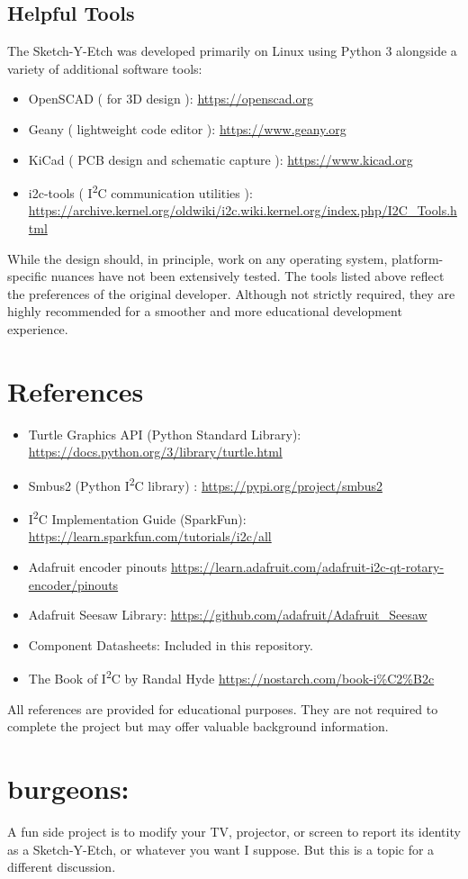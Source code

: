\documentclass[]{article}
\begin{document}
\subsection*{Helpful Tools}

The Sketch-Y-Etch was developed primarily on Linux using Python 3 alongside a variety of additional software tools:

\begin{itemize}
	\item OpenSCAD ( for 3D design ): \url{https://openscad.org}
	\item Geany ( lightweight code editor ): \url{https://www.geany.org}
	\item KiCad ( PCB design and schematic capture ): \url{https://www.kicad.org}
	\item i2c-tools ( I\textsuperscript{2}C communication utilities ): \url{https://archive.kernel.org/oldwiki/i2c.wiki.kernel.org/index.php/I2C_Tools.html}
\end{itemize}

While the design should, in principle, work on any operating system, platform-specific nuances have not been extensively tested.  
The tools listed above reflect the preferences of the original developer. Although not strictly required, they are highly recommended for a smoother and more educational development experience.

\section*{References}

\begin{itemize}
	\item Turtle Graphics API (Python Standard Library): \url{https://docs.python.org/3/library/turtle.html}
	\item Smbus2 (Python I\textsuperscript{2}C library) : \url{https://pypi.org/project/smbus2}
	\item I\textsuperscript{2}C Implementation Guide (SparkFun): \url{https://learn.sparkfun.com/tutorials/i2c/all}
	\item Adafruit encoder pinouts \url{https://learn.adafruit.com/adafruit-i2c-qt-rotary-encoder/pinouts}
	\item Adafruit Seesaw Library: \url{https://github.com/adafruit/Adafruit_Seesaw}
	\item Component Datasheets: Included in this repository.
	\item The Book of I\textsuperscript{2}C by Randal Hyde \url{https://nostarch.com/book-i%C2%B2c}
\end{itemize}

All references are provided for educational purposes. They are not required to complete the project but may offer valuable background information.

\section*{burgeons:}
A fun side project is to modify your TV, projector, or screen to report its identity as a Sketch-Y-Etch, or whatever you want I suppose. But this is a topic for a different discussion.  
\end{document}
